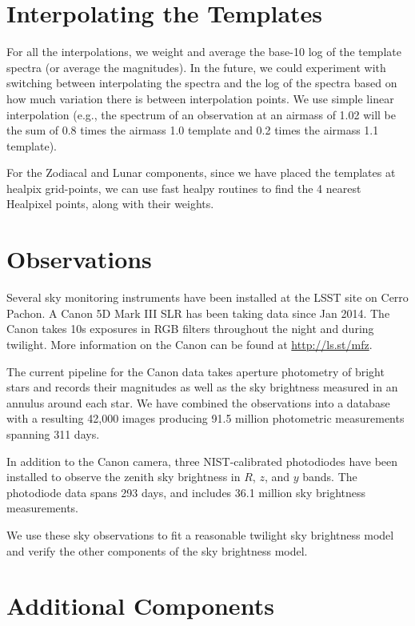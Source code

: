 \documentclass{emulateapj}  %
\begin{document}
\section{Interpolating the Templates}\label{sec:interp}

For all the interpolations, we weight and average the base-10 log of the template spectra (or average the magnitudes).  In the future, we could experiment with switching between interpolating the spectra and the log of the spectra based on how much variation there is between interpolation points.  We use simple linear interpolation (e.g., the spectrum of an observation at an airmass of 1.02 will be the sum of 0.8 times the airmass 1.0 template and 0.2 times the airmass 1.1 template). 

For the Zodiacal and Lunar components, since we have placed the templates at healpix grid-points, we can use fast healpy routines to find the 4 nearest Healpixel points, along with their weights.  


\section{Observations}\label{sec:obs}

Several sky monitoring instruments have been installed at the LSST site on Cerro Pachon.  A Canon 5D Mark III SLR has been taking data since Jan 2014.  The Canon takes 10s exposures in RGB filters throughout the night and during twilight.  More information on the Canon can be found at \url{http://ls.st/mfz}.

The current pipeline for the Canon data takes aperture photometry of bright stars and records their magnitudes as well as the sky brightness measured in an annulus around each star.  We have combined the observations into a database with a resulting 42,000 images producing 91.5 million photometric measurements spanning 311 days.  

In addition to the Canon camera, three NIST-calibrated photodiodes have been installed to observe the zenith sky brightness in $R$, $z$, and $y$ bands. The photodiode data spans 293 days, and includes 36.1 million sky brightness measurements.

We use these sky observations to fit a reasonable twilight sky brightness model and verify the other components of the sky brightness model.

\section{Additional Components}\label{sec:twi}
\end{document}
